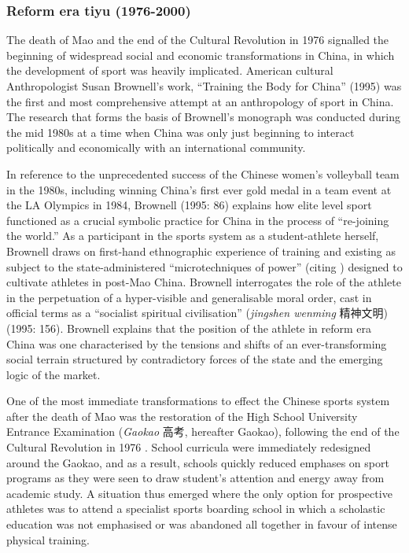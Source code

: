 \begin{CJK}{UTF8}{gbsn}
\subsubsection{Reform era tiyu (1976-2000)}
The death of Mao and the end of the Cultural Revolution in 1976 signalled the beginning of widespread social and economic transformations in China, in which the development of sport was heavily implicated.  American cultural Anthropologist Susan Brownell’s work, ``Training the Body for China'' (1995) was the first and most comprehensive attempt at an anthropology of sport in China. The research that forms the basis of Brownell's monograph was conducted during the mid 1980s at a time when China was only just beginning to interact politically and economically with an international community.

In reference to the unprecedented success of the Chinese women’s volleyball team in the 1980s, including winning China's first ever gold medal in a team event at the LA Olympics in 1984, Brownell (1995: 86) explains how elite level sport functioned as a crucial symbolic practice for China in the process of ``re-joining the world.''  As a participant in the sports system as a student-athlete herself, Brownell draws on first-hand ethnographic experience of training and existing as subject to the state-administered ``microtechniques of power'' (citing \cite{Foucault1977}) designed to cultivate athletes in post-Mao China.  Brownell interrogates the role of the athlete in the perpetuation of a hyper-visible and generalisable moral order, cast in official terms as a ``socialist spiritual civilisation'' (\textit{jingshen wenming} 精神文明) (1995: 156).  Brownell explains that the position of the athlete in reform era China was one characterised by the tensions and shifts of an ever-transforming social terrain structured by contradictory forces of the state and the emerging logic of the market.

One of the most immediate transformations to effect the Chinese sports system after the death of Mao was the restoration of the High School University Entrance Examination (\textit{Gaokao} 高考, hereafter Gaokao), following the end of the Cultural Revolution in 1976 \citep[198]{Brownell1995}.  School curricula were immediately redesigned around the Gaokao, and as a result, schools quickly reduced emphases on sport programs as they were seen to draw student’s attention and energy away from academic study.  A situation thus emerged where the only option for prospective athletes was to attend a specialist sports boarding school in which a scholastic education was not emphasised or was abandoned all together in favour of intense physical training.


\end{CJK}
